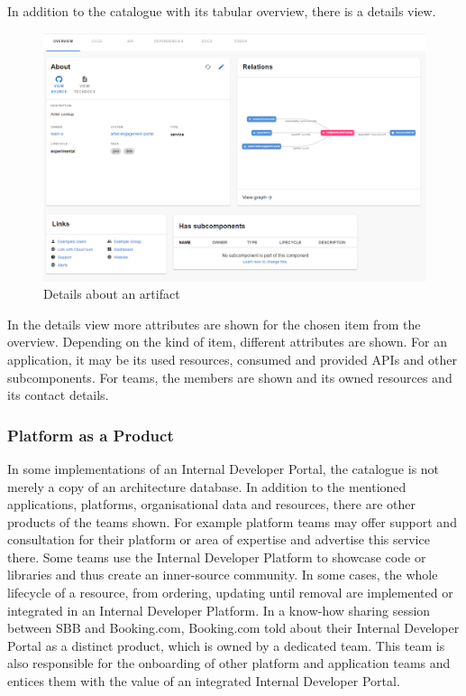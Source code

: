 \documentclass[a4paper,12pt]{article}
\begin{document}
    In addition to the catalogue with its tabular overview, there is a details view.
    \begin{figure}
        \includegraphics[width=\linewidth]{backstage_item_details}
        \caption{Details about an artifact}
        \label{fig:portaldetails}
    \end{figure}
    In the details view more attributes are shown for the chosen item from the overview.
    Depending on the kind of item, different attributes are shown.
    For an application, it may be its used resources, consumed and provided APIs and other subcomponents.
    For teams, the members are shown and its owned resources and its contact details.


    \subsubsection{Platform as a Product}
    \label{sssec:paap}
    In some implementations of an Internal Developer Portal, the catalogue is not merely a copy of an architecture database.
    In addition to the mentioned applications, platforms, organisational data and resources, there are other products
    of the teams shown.
    For example platform teams may offer support and consultation for their platform or area of expertise and advertise
    this service there.
    Some teams use the Internal Developer Platform to showcase code or libraries and thus create an inner-source community.
    In some cases, the whole lifecycle of a resource, from ordering, updating until removal are implemented or integrated
    in an Internal Developer Platform.
    In a know-how sharing session between SBB and Booking.com, Booking.com told about their Internal Developer Portal as a
    distinct product, which is owned by a dedicated team.
    This team is also responsible for the onboarding of other platform and application teams and entices them with the
    value of an integrated Internal Developer Portal.
\end{document}
